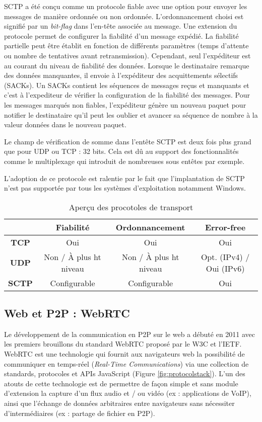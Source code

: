 \gls{SCTP} a été conçu comme un protocole fiable avec une option pour envoyer 
les messages de manière ordonnée ou non ordonnée. L'ordonnancement choisi est 
signifié par un \textit{bit-flag} dans l'en-tête associée au message. Une extension 
du protocole permet de configurer la fiabilité d'un message expédié. La fiabilité 
partielle peut être établit en fonction de différents paramètres (temps d'attente ou 
nombre de tentatives 
avant retransmission). Cependant, seul l'expéditeur est au courant du niveau de 
fiabilité des données. Lorsque le destinataire remarque des données manquantes, 
il envoie à l'expéditeur des acquittements sélectifs (SACKs). Un SACKs contient 
les séquences de messages reçus et manquants et c'est à l'expediteur de vérifier 
la configuration de la fiabilité des messages. Pour les messages marqués non 
fiables, l'expéditeur génère un nouveau paquet pour notifier le destinataire qu'il 
peut les \og oublier\fg{} et avancer sa séquence de nombre à la valeur données 
dans le nouveau paquet. 

Le champ de vérification de somme dans l'entête \gls{SCTP} est deux fois plus 
grand que pour \gls{UDP} ou \gls{TCP} : 32 bits. Cela est dû au support des 
fonctionnalités comme le multiplexage qui introduit de nombreuses sous entêtes 
par exemple.

L'adoption de ce protocole est ralentie par le fait que l'implantation de \gls{SCTP} 
n'est pas supportée par tous les systèmes d'exploitation notamment 
Windows\cite{Hogg}. 

\begin{table}[h]
	\caption{Aperçu des procotoles de transport}
	\noindent\small
	\begin{tabular}{cccc}
		& \textbf{Fiabilité} & \textbf{Ordonnancement} & \textbf{Error-free} \\ 
		\hline 
		\textbf{TCP} & Oui & Oui & Oui \\ 
		\hline 
		\textbf{UDP} & Non / À plus ht niveau & Non / À plus 
		ht 
		niveau & Opt. 
		(IPv4) / 
		Oui (IPv6) \\ 
		\hline 
		\textbf{SCTP} & Configurable & Configurable &  Oui \\ 
		\hline
	\end{tabular} 
\end{table}

\subsection{Web et P2P : WebRTC}
Le développement de la communication en \gls{P2P} sur le web a 
débuté en 2011 avec les premiers brouillons du standard \gls{WebRTC} proposé 
par le \gls{W3C} et l'\gls{IETF}\textsuperscript{\textregistered}. 
\gls{WebRTC} est une technologie qui fournit aux navigateurs web la possibilité de 
communiquer en temps-réel (\textit{Real-Time Communications}) via une collection 
de standards, protocoles et \glspl{API} JavaScript (Figure \ref{fig:protocolstack}). 
L'un des atouts de cette technologie est de permettre de façon simple et 
sans module d'extension la capture d'un flux audio et / ou vidéo (ex : 
applications de VoIP), ainsi que l'échange de données arbitraires entre 
navigateurs sans nécessiter d'intermédiaires (ex : partage de fichier en 
P2P).


